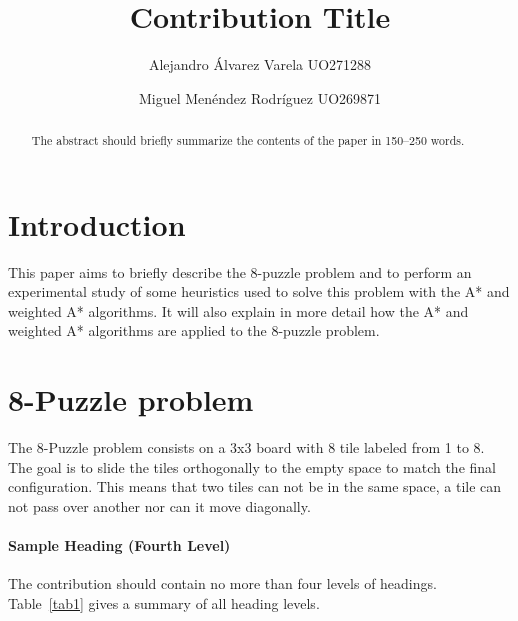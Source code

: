 \documentclass[runningheads]{llncs}
\begin{document}
%
\title{Contribution Title}
%
%
\author{Alejandro Álvarez Varela UO271288\and
Miguel Menéndez Rodríguez UO269871}


\maketitle   
\begin{abstract}
The abstract should briefly summarize the contents of the paper in
150--250 words.

\end{abstract}

\section{Introduction}
This paper aims to briefly describe the 8-puzzle problem and to perform an experimental study of some heuristics used to solve this problem with the A* and weighted A* algorithms. It will also explain in more detail how the A* and weighted A* algorithms are applied to the 8-puzzle problem.


\section{8-Puzzle problem} 
The 8-Puzzle problem consists on a 3x3 board with 8 tile labeled from 1 to 8. The goal is to slide the tiles orthogonally to the empty space to match the final configuration. This means that two tiles can not be in the same space, a tile can not pass over another nor can it move diagonally.

\paragraph{Sample Heading (Fourth Level)}
The contribution should contain no more than four levels of
headings. Table~\ref{tab1} gives a summary of all heading levels.
\end{document}
